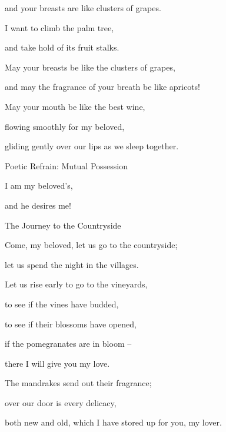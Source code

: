 {\par }{\Q and your breasts
are like clusters of grapes.
\par }{\Q {}I want
to climb
the palm tree,
\par }{\Q and take hold
of its fruit stalks.
\par }{\Q May
your breasts
be
like the clusters
of grapes,
\par }{\Q and may the fragrance
of your breath
be like apricots!
\par }{\Q {}May your mouth
be like the best
wine,
\par }{\Q flowing smoothly
for my beloved,
\par }{\Q gliding
gently
over our lips
as we
sleep together.
\par }{\SH Poetic Refrain: Mutual Possession
\par }{\SH 
{}
\par }{\Q {}I
am my beloved’s,
\par }{\Q and he desires me!
\par }{\SH The Journey to the Countryside
\par }{\SH 
{}
\par }{\Q {}Come,
my beloved,
let us go
to the countryside;
\par }{\Q let us spend
the night in the villages.
\par }{\Q {}Let us rise early
to go to the vineyards,
\par }{\Q to see
if
the vines
have budded,
\par }{\Q to see if their blossoms
have opened,
\par }{\Q if the pomegranates
are in bloom
–
\par }{\Q there
I will give
you my love.
\par }{\Q {}The mandrakes
send out
their fragrance;
\par }{\Q over
our door
is every
delicacy,
\par }{\Q both
new
and old,
which I have stored up
for you, my lover.

\par }
